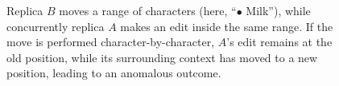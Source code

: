 \documentclass[sigplan,10pt]{acmart}
\begin{document}
\begin{figure}
    \caption{Replica $B$ moves a range of characters (here, ``$\bullet$ Milk''), while concurrently replica $A$ makes an edit inside the same range. If the move is performed character-by-character, $A$'s edit remains at the old position, while its surrounding context has moved to a new position, leading to an anomalous outcome.}
    \label{fig:range-bad}
\end{figure}
\end{document}
